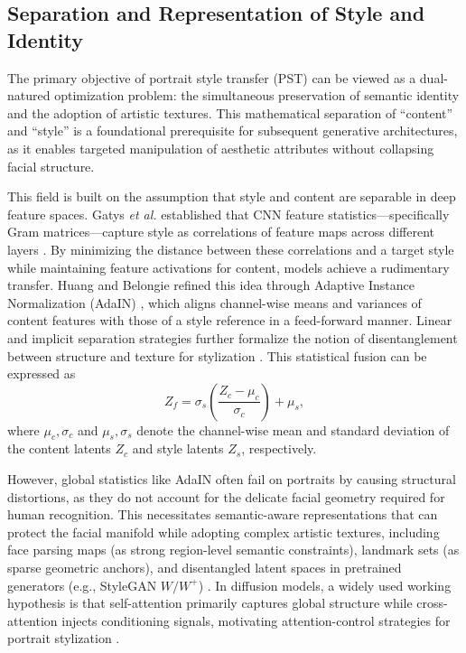 \documentclass[journal]{IEEEtran}
\begin{document}
\subsection{Separation and Representation of Style and Identity}
\label{sec:theory:disentangle}
The primary objective of portrait style transfer (PST) can be viewed as a dual-natured optimization problem: the simultaneous preservation of semantic identity and the adoption of artistic textures. This mathematical separation of ``content'' and ``style'' is a foundational prerequisite for subsequent generative architectures, as it enables targeted manipulation of aesthetic attributes without collapsing facial structure.

This field is built on the assumption that style and content are separable in deep feature spaces. Gatys \emph{et al.} established that CNN feature statistics---specifically Gram matrices---capture style as correlations of feature maps across different layers \cite{gatys2015ana,gatys2016image}. By minimizing the distance between these correlations and a target style while maintaining feature activations for content, models achieve a rudimentary transfer. Huang and Belongie refined this idea through Adaptive Instance Normalization (AdaIN) \cite{huang2017arbitraryst}, which aligns channel-wise means and variances of content features with those of a style reference in a feed-forward manner. Linear and implicit separation strategies further formalize the notion of disentanglement between structure and texture for stylization \cite{li2018linearst,frenkel2024implicitss}. This statistical fusion can be expressed as
\begin{equation}
  Z_f = \sigma_s \left( \frac{Z_c - \mu_c}{\sigma_c} \right) + \mu_s,
\end{equation}
where $\mu_c, \sigma_c$ and $\mu_s, \sigma_s$ denote the channel-wise mean and standard deviation of the content latents $Z_c$ and style latents $Z_s$, respectively.

However, global statistics like AdaIN often fail on portraits by causing structural distortions, as they do not account for the delicate facial geometry required for human recognition. This necessitates semantic-aware representations that can protect the facial manifold while adopting complex artistic textures, including face parsing maps (as strong region-level semantic constraints), landmark sets (as sparse geometric anchors), and disentangled latent spaces in pretrained generators (e.g., StyleGAN $W/W^+$) \cite{shen2020interfacegan}. In diffusion models, a widely used working hypothesis is that self-attention primarily captures global structure while cross-attention injects conditioning signals, motivating attention-control strategies for portrait stylization \cite{hertz2023styleai, kwon2022diffuseit}.
\end{document}
